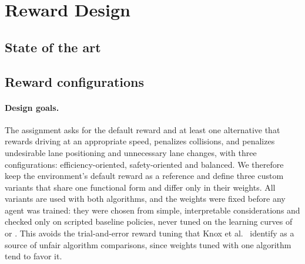 \section{Reward Design}\label{sec:reward}

\subsection{State of the art}\label{sec:sota-reward}

\subsection{Reward configurations}\label{sec:reward-configs}

\paragraph{Design goals.}
The assignment asks for the default  reward and at least one alternative that rewards driving at an
appropriate speed, penalizes collisions, and penalizes undesirable lane positioning and unnecessary lane changes, with
three configurations: efficiency-oriented, safety-oriented and balanced. We therefore keep the environment's default
reward as a reference and define three custom variants that share one functional form and differ only in their
weights. All variants are used with both algorithms, and the weights were fixed before any agent was trained: they
were chosen from simple, interpretable considerations and checked only on scripted baseline policies, never tuned on
the learning curves of \ddqn{} or \ppo{}. This avoids the trial-and-error reward tuning that Knox et
al.~\cite{knox2023reward} identify as a source of unfair algorithm comparisons, since weights tuned with one
algorithm tend to favor it.

